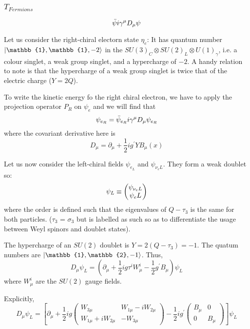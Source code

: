     \subsubsection{$T_{Fermions}$}
    \label{ch:15:review of sm:t_fermions}

    \begin{equation}
      \Bar{\psi} i \gamma^\mu D_\mu \psi
    \end{equation}

    Let us consider the right-chiral electorn state $\eta_e$: It has quantum number $\ket{\mathbb{1}, \mathbb{1}, -2}$ in the $SU(3)_C \otimes SU(2)_L \otimes U(1)_\gamma$, i.e. a colour singlet, a weak group singlet, and a hypercharge of $-2$. A handy relation to note is that the hypercharge of a weak group singlet is twice that of the electric charge ($Y = 2Q$).

    To write the kinetic energy fo the right chiral electron, we have to apply the projection operator $P_R$ on $\psi_e$ and we will find that
    \begin{equation}
      \psi_{e_R} = \Bar{\psi}_{e_R} i \gamma^\mu D_\mu \psi_{e_R}
    \end{equation}
    where the covariant derivative here is
    \begin{equation}
      D_\mu = \partial_\mu + \frac{1}{2} i g^\prime Y B_\mu(x)
    \end{equation}

    Let us now consider the left-chiral fields $\psi_{e_L}$ and $\psi_{\nu_eL}$. They form a weak doublet so:
    \begin{equation}
      \psi_L \equiv \begin{pmatrix}{\psi_{\nu_eL}}\\{\psi_eL}\end{pmatrix}
    \end{equation}
    where the order is defined such that the eigenvalues of $Q - \tau_3$ is the same for both particles. ($\tau_3$ = $\sigma_3$ but is labelled as such so as to differentiate the usage between Weyl spinors and doublet states).

    The hypercharge of an $SU(2)$ doublet is $Y = 2 (Q-\tau_3) = -1$. The quatum numbers are $\ket{\mathbb{1}, \mathbb{2}, -1}$. Thus,
    \begin{equation}
      D_\mu \psi_L = (\partial_\mu + \frac{1}{2} i g \tau^i W^i_\mu - \frac{1}{2} g^\prime B_\mu) \psi_L
    \end{equation}
    where $W_\mu^i$ are the $SU(2)$ gauge fields.

    Explicitly,
    \begin{equation}
      D_\mu \psi_L = \left[ \partial_\mu + \frac{1}{2} i g
        \begin{pmatrix}
          W_{3\mu} & W_{1\mu} - i W_{2\mu} \\
          W_{1\mu} + i W_{2\mu} & -W_{3\mu}
        \end{pmatrix} - \frac{1}{2} i g^\prime
        \begin{pmatrix}
          B_\mu & 0 \\ 0 & B_\mu
        \end{pmatrix}
        \right] \psi_L
      \label{eqn:15:review of sm:explicit d mu}
    \end{equation}

